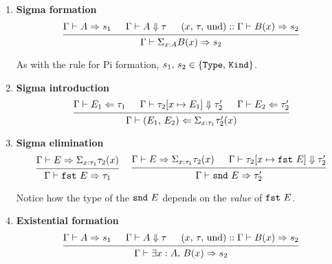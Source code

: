 \documentclass{article}
\begin{document}
\begin{enumerate}
\item \textbf{Sigma formation} \\
  \[
    \begin{prooftree}
      \hypo{\Gamma \vdash A \Rightarrow s_1}
      \hypo{\Gamma \vdash A \Downarrow \tau}
      \hypo{(x, \, \tau, \, \text{und}) :: \Gamma \vdash B(x) \Rightarrow s_2}
      \infer3{\Gamma \vdash \Sigma_{x : A}B(x) \Rightarrow s_2}
    \end{prooftree}
  \]

  As with the rule for Pi formation, $s_1, \, s_2 \in \{\texttt{Type}, \, \texttt{Kind}\}$.

\item \textbf{Sigma introduction} \\
  \[
    \begin{prooftree}
      \hypo{\Gamma \vdash E_1 \Leftarrow \tau_1}
      \hypo{\Gamma \vdash \tau_2[x \mapsto E_1] \Downarrow \tau_2'}
      \hypo{\Gamma \vdash E_2 \Leftarrow \tau_2'}
      \infer3{\Gamma \vdash (E_1, \, E_2) \Leftarrow 
        \Sigma_{x : \tau_1}\tau_2'(x)}
    \end{prooftree}
  \]
  
\item \textbf{Sigma elimination} \\
  \begin{gather*}
    \begin{prooftree}
      \hypo{\Gamma \vdash E \Rightarrow \Sigma_{x : \tau_1}\tau_2(x)}
      \infer1{\Gamma \vdash \fst \,\, E \Rightarrow \tau_1}
    \end{prooftree}
  ~ \quad
    \begin{prooftree}
      \hypo{\Gamma \vdash E \Rightarrow \Sigma_{x : \tau_1}\tau_2(x)}
      \hypo{\Gamma \vdash \tau_2[x \mapsto \fst \,\, E] \Downarrow \tau_2'}
      \infer2{\Gamma \vdash \snd \,\, E \Rightarrow \tau_2'}
    \end{prooftree}
  \end{gather*}

  Notice how the type of the $\texttt{snd} \,\, E$ depends on the \textit{value} of
  $\texttt{fst} \,\, E$.

\item \textbf{Existential formation} \\
\[
    \begin{prooftree}
      \hypo{\Gamma \vdash A \Rightarrow s_1}
      \hypo{\Gamma \vdash A \Downarrow \tau}
      \hypo{(x, \, \tau, \, \text{und}) :: \Gamma \vdash B(x) \Rightarrow s_2}
      \infer3{\Gamma \vdash \exists x : A, \, B(x) \Rightarrow s_2}
    \end{prooftree}
\]


\end{enumerate}
\end{document}

